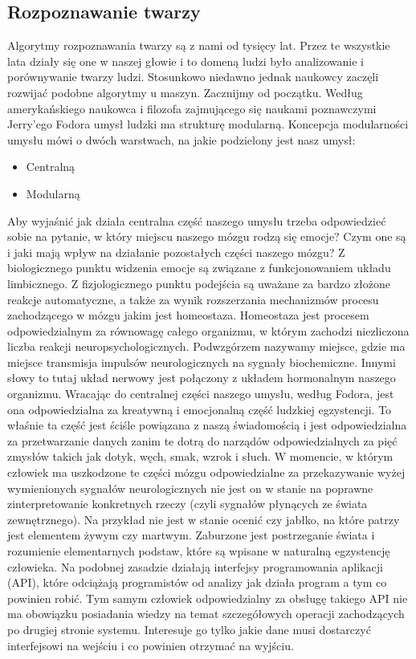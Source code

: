 \documentclass{article}
\begin{document}
	\subsection{Rozpoznawanie twarzy}
	\par
	Algorytmy rozpoznawania twarzy są z nami od tysięcy lat. Przez te wszystkie lata działy się one w naszej głowie i to domeną ludzi było analizowanie i porównywanie twarzy ludzi. Stosunkowo niedawno jednak naukowcy zaczęli rozwijać podobne algorytmy u maszyn. Zacznijmy od początku. Według amerykańskiego naukowca i filozofa zajmującego się naukami poznawczymi Jerry'ego Fodora\cite{ref15} umysł ludzki ma strukturę modularną. Koncepcja modularności umysłu mówi o dwóch warstwach, na jakie podzielony jest nasz umysł:
	\begin{itemize}
		\item Centralną
		\item Modularną
	\end{itemize}
	\par
	Aby wyjaśnić jak działa centralna część naszego umysłu trzeba odpowiedzieć sobie na pytanie, w który miejscu naszego mózgu rodzą się emocje? Czym one są i jaki mają wpływ na działanie pozostałych części naszego mózgu? Z biologicznego punktu widzenia emocje są związane z funkcjonowaniem układu limbicznego. Z fizjologicznego punktu podejścia są uważane za bardzo złożone reakcje automatyczne, a także za wynik rozszerzania mechanizmów procesu zachodzącego w mózgu jakim jest homeostaza. Homeostaza jest procesem odpowiedzialnym za równowagę całego organizmu, w którym zachodzi niezliczona liczba reakcji neuropsychologicznych. Podwzgórzem nazywamy miejsce, gdzie ma miejsce transmisja impulsów neurologicznych na sygnały biochemiczne. Innymi słowy to tutaj układ nerwowy jest połączony z układem hormonalnym naszego organizmu. Wracając do centralnej części naszego umysłu, według Fodora, jest ona odpowiedzialna za kreatywną i emocjonalną część ludzkiej egzystencji. To właśnie ta część jest ściśle powiązana z naszą świadomością i jest odpowiedzialna za przetwarzanie danych zanim te dotrą do narządów odpowiedzialnych za pięć zmysłów takich jak dotyk, węch, smak, wzrok i słuch. W momencie, w którym człowiek ma uszkodzone te części mózgu odpowiedzialne za przekazywanie wyżej wymienionych sygnałów neurologicznych nie jest on w stanie na poprawne zinterpretowanie konkretnych rzeczy (czyli sygnałów płynących ze świata zewnętrznego). Na przykład nie jest w stanie ocenić czy jabłko, na które patrzy jest elementem żywym czy martwym. Zaburzone jest postrzeganie świata i rozumienie elementarnych podstaw, które są wpisane w naturalną egzystencję człowieka. Na podobnej zasadzie działają interfejsy programowania aplikacji (API), które odciążają programistów od analizy jak działa program a tym co powinien robić. Tym samym człowiek odpowiedzialny za obsługę takiego API nie ma obowiązku posiadania wiedzy na temat szczegółowych operacji zachodzących po drugiej stronie systemu. Interesuje go tylko jakie dane musi dostarczyć  interfejsowi na wejściu i co powinien otrzymać na wyjściu.
\end{document}

